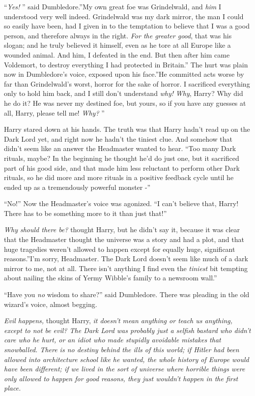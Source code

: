 ``\emph{Yes!} '' said Dumbledore.''My own great foe was Grindelwald, and
\emph{him} I understood very well indeed. Grindelwald was my dark
mirror, the man I could so easily have been, had I given in to the
temptation to believe that I was a good person, and therefore always in
the right. \emph{For the greater good}, that was his slogan; and he
truly believed it himself, even as he tore at all Europe like a wounded
animal. And him, I defeated in the end. But then after him came
Voldemort, to destroy everything I had protected in Britain.'' The hurt
was plain now in Dumbledore's voice, exposed upon his face.''He
committed acts worse by far than Grindelwald's worst, horror for the
sake of horror. I sacrificed everything only to hold him back, and I
still don't understand \emph{why!} \emph{Why}, Harry? Why did he do it?
He was never my destined foe, but yours, so if you have any guesses at
all, Harry, please tell me! \emph{Why?} ''

Harry stared down at his hands. The truth was that Harry hadn't read up
on the Dark Lord yet, and right now he hadn't the tiniest clue. And
somehow that didn't seem like an answer the Headmaster wanted to hear.
``Too many Dark rituals, maybe? In the beginning he thought he'd do just
one, but it sacrificed part of his good side, and that made him less
reluctant to perform other Dark rituals, so he did more and more rituals
in a positive feedback cycle until he ended up as a tremendously
powerful monster -''

``No!'' Now the Headmaster's voice was agonized. ``I can't believe that,
Harry! There has to be something more to it than just that!''

\emph{Why should there be?} thought Harry, but he didn't say it, because
it was clear that the Headmaster thought the universe was a story and
had a plot, and that huge tragedies weren't allowed to happen except for
equally huge, significant reasons.''I'm sorry, Headmaster. The Dark Lord
doesn't seem like much of a dark mirror to me, not at all. There isn't
anything I find even the \emph{tiniest} bit tempting about nailing the
skins of Yermy Wibble's family to a newsroom wall.''

``Have you \emph{no} wisdom to share?'' said Dumbledore. There was
pleading in the old wizard's voice, almost begging.

\emph{Evil happens,} thought Harry, \emph{it doesn't mean anything or
teach us anything, except to not be evil? The Dark Lord was probably
just a selfish bastard who didn't care who he hurt, or an idiot who made
stupidly avoidable mistakes that snowballed. There is no destiny behind
the ills of this world; if Hitler had been allowed into architecture
school like he wanted, the whole history of Europe would have been
different; if we lived in the sort of universe where horrible things
were only allowed to happen for good reasons, they just wouldn't happen
in the first place.}

